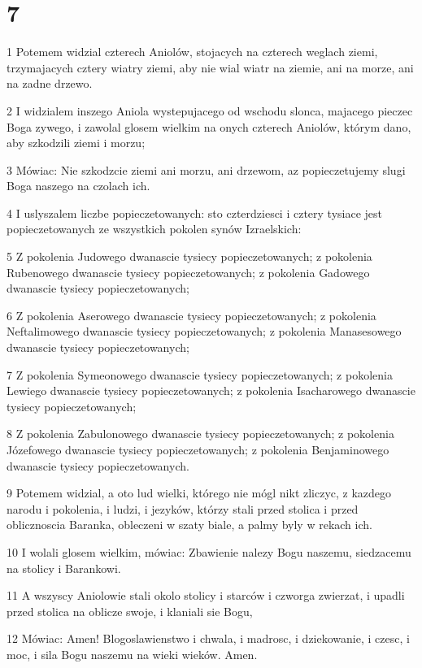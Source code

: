 \chapter{7}

\par 1 Potemem widzial czterech Aniolów, stojacych na czterech weglach ziemi, trzymajacych cztery wiatry ziemi, aby nie wial wiatr na ziemie, ani na morze, ani na zadne drzewo.
\par 2 I widzialem inszego Aniola wystepujacego od wschodu slonca, majacego pieczec Boga zywego, i zawolal glosem wielkim na onych czterech Aniolów, którym dano, aby szkodzili ziemi i morzu;
\par 3 Mówiac: Nie szkodzcie ziemi ani morzu, ani drzewom, az popieczetujemy slugi Boga naszego na czolach ich.
\par 4 I uslyszalem liczbe popieczetowanych: sto czterdziesci i cztery tysiace jest popieczetowanych ze wszystkich pokolen synów Izraelskich:
\par 5 Z pokolenia Judowego dwanascie tysiecy popieczetowanych; z pokolenia Rubenowego dwanascie tysiecy popieczetowanych; z pokolenia Gadowego dwanascie tysiecy popieczetowanych;
\par 6 Z pokolenia Aserowego dwanascie tysiecy popieczetowanych; z pokolenia Neftalimowego dwanascie tysiecy popieczetowanych; z pokolenia Manasesowego dwanascie tysiecy popieczetowanych;
\par 7 Z pokolenia Symeonowego dwanascie tysiecy popieczetowanych; z pokolenia Lewiego dwanascie tysiecy popieczetowanych; z pokolenia Isacharowego dwanascie tysiecy popieczetowanych;
\par 8 Z pokolenia Zabulonowego dwanascie tysiecy popieczetowanych; z pokolenia Józefowego dwanascie tysiecy popieczetowanych; z pokolenia Benjaminowego dwanascie tysiecy popieczetowanych.
\par 9 Potemem widzial, a oto lud wielki, którego nie mógl nikt zliczyc, z kazdego narodu i pokolenia, i ludzi, i jezyków, którzy stali przed stolica i przed oblicznoscia Baranka, obleczeni w szaty biale, a palmy byly w rekach ich.
\par 10 I wolali glosem wielkim, mówiac: Zbawienie nalezy Bogu naszemu, siedzacemu na stolicy i Barankowi.
\par 11 A wszyscy Aniolowie stali okolo stolicy i starców i czworga zwierzat, i upadli przed stolica na oblicze swoje, i klaniali sie Bogu,
\par 12 Mówiac: Amen! Blogoslawienstwo i chwala, i madrosc, i dziekowanie, i czesc, i moc, i sila Bogu naszemu na wieki wieków. Amen.
